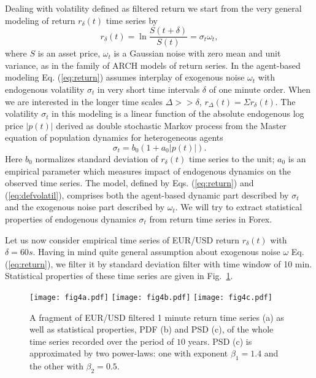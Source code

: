 \documentclass{article}
\newcommand\figref[1]{Fig.~\ref{#1}}
\begin{document}
Dealing with  volatility defined as filtered return we start from the very general modeling of return $r_{\delta}(t)$ time series by  
\begin{equation}
r_{\delta}(t) = \ln\frac{S(t+\delta)}{S(t)}=\sigma_t \omega_t,
\label{eq:return}
\end{equation}
where $S$ is an asset price, $\omega_t$ is a Gaussian noise with zero mean and unit variance, as in the family of ARCH  models of return series. In the agent-based modeling \cite{Gontis2014PlosOne,Gontis2016PhysA} Eq. (\ref{eq:return}) assumes interplay of exogenous noise $\omega_t$ with endogenous volatility $\sigma_t$ in very short time intervals $\delta$ of one minute order. When we are interested in the longer time scales $\Delta>>\delta$, $r_{\Delta}(t)=\Sigma r_{\delta}(t)$.
The volatility $\sigma_t$ in this modeling is  a linear function of the
absolute endogenous log price $\vert p(t) \vert$ derived as double stochastic Markov process from the Master equation of population dynamics for heterogeneous agents \cite{Gontis2014PlosOne}
\begin{equation}
\sigma_t = b_0(1+ a_0 \vert p(t) \vert).
\label{eq:defvolatil}
\end{equation}
Here $b_0$ normalizes standard deviation of $r_{\delta}(t)$ time series to the unit; $a_0$ is an empirical parameter which measures impact of endogenous dynamics on
the observed time series. The model, defined by Eqs. (\ref{eq:return})
and (\ref{eq:defvolatil}), comprises both the agent-based dynamic part described by
$\sigma_t$ and the exogenous noise part described by $\omega_t$. We will try to extract statistical properties of endogenous dynamics $\sigma_t$ from return time series in Forex. 

Let us now consider empirical time series of EUR/USD return $r_{\delta}(t)$ with $\delta=60 s$. Having in mind quite general assumption about exogenous noise $\omega$ Eq. (\ref{eq:return}), we filter it by standard deviation filter with time window of 10 min. Statistical properties of these time series are given in \figref{fig4}.

\begin{figure}[h]
\centering
\texttt{[image: fig4a.pdf]}
\texttt{[image: fig4b.pdf]}
\texttt{[image: fig4c.pdf]}
\caption{\label{fig4} A fragment of EUR/USD filtered 1 minute return time series (a) as well as statistical properties, PDF (b) and PSD (c), of the whole time series recorded over the period of $10$ years. PSD (c) is approximated by two power-laws: one with exponent $\beta_1=1.4$ and the other with $\beta_2=0.5$.}
\end{figure}
\end{document}
